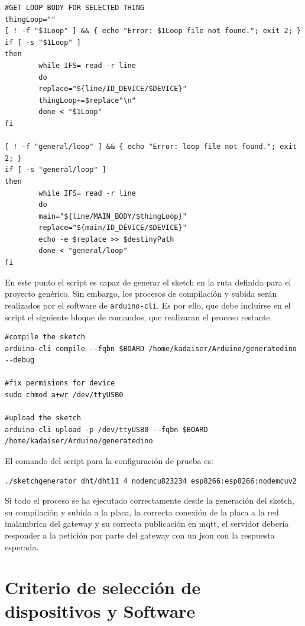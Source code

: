 \begin{verbatim}
#GET LOOP BODY FOR SELECTED THING
thingLoop=""
[ ! -f "$1Loop" ] && { echo "Error: $1Loop file not found."; exit 2; }
if [ -s "$1Loop" ]
then
        while IFS= read -r line
        do
        replace="${line/ID_DEVICE/$DEVICE}"
        thingLoop+=$replace"\n"
        done < "$1Loop"
fi

[ ! -f "general/loop" ] && { echo "Error: loop file not found."; exit 2; }
if [ -s "general/loop" ]
then
        while IFS= read -r line
        do
        main="${line/MAIN_BODY/$thingLoop}"
        replace="${main/ID_DEVICE/$DEVICE}"
        echo -e $replace >> $destinyPath
        done < "general/loop"
fi

\end{verbatim}

En este punto el \gls{script} es capaz de generar el sketch en la ruta definida para el proyecto genérico. Sin embargo, los procesos de compilación y subida serán realizados por el software de \verb|arduino-cli|. Es por ello, que debe incluirse en el \gls{script} el siguiente bloque de comandos, que realizaran el proceso restante.

\begin{verbatim}
#compile the sketch
arduino-cli compile --fqbn $BOARD /home/kadaiser/Arduino/generatedino --debug

#fix permisions for device
sudo chmod a+wr /dev/ttyUSB0

#upload the sketch
arduino-cli upload -p /dev/ttyUSB0 --fqbn $BOARD /home/kadaiser/Arduino/generatedino
\end{verbatim}

El comando del \gls{script} para la configuración de prueba es:
\begin{verbatim}
./sketchgenerator dht/dht11 4 nodemcu823234 esp8266:esp8266:nodemcuv2
\end{verbatim}

Si todo el proceso se ha ejecutado correctamente desde la generación del sketch, su compilación y subida a la placa, la correcta conexión de la placa a la red inalambrica del \gls{gateway} y su correcta publicación en \gls{mqtt}, el servidor debería responder a la petición por parte del \gls{gateway} con un \gls{json} con la respuesta esperada.

\section{Criterio de selección de dispositivos y Software}
\label{ch:Capitulo4.4}


